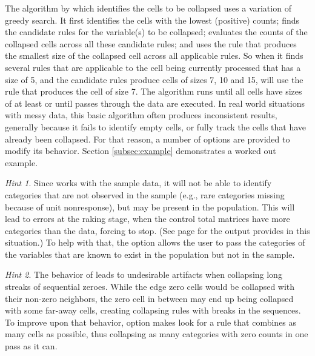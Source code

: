 The algorithm by which  identifies the cells to be collapsed uses
a variation of greedy search.
It first identifies the cells with the lowest (positive) counts; finds the candidate rules
for the variable(s) to be collapsed; evaluates the counts of the collapsed cells across all
these candidate rules; and uses the rule that produces the smallest size of the
collapsed cell across all applicable rules. So when it finds several rules that are applicable
to the cell being currently processed that has a size of 5, and the candidate rules produce cells
of sizes 7, 10 and 15,  will use the rule that produces the cell
of size 7. The algorithm runs until all cells have sizes of at least
 or until  passes through the data are executed.
In real world situations with messy data, this basic algorithm often produces inconsistent
results, generally because it fails to identify empty cells, or fully track the cells
that have already been collapsed.
For that reason, a number of options are provided to modify its behavior.
Section \ref{subsec:example} demonstrates a worked out example.

\textit{Hint 1}. Since  works with the sample data,
it will not be able to identify categories that are not observed in the sample 
(e.g., rare categories missing because of unit nonresponse),
but may be present in the population. This will lead to errors at the raking stage,
when the control total matrices have more categories than the data, forcing  to stop.
(See page \pageref{page:mismatch} for the output  provides in this situation.)
To help with that, the option  allows the user to pass the categories
of the variables that are known to exist in the population but not in the sample.

\textit{Hint 2}. The behavior of  
leads to undesirable artifacts when collapsing long streaks of sequential zeroes.
While the edge zero cells would be collapsed with their non-zero neighbors,
the zero cell in between may end up being collapsed with some far-away cells,
creating collapsing rules with breaks
in the sequences. To improve upon that behavior, option  makes
 look for a rule that combines as many cells as possible, 
thus collapsing as many categories with zero counts in one pass as it can.

